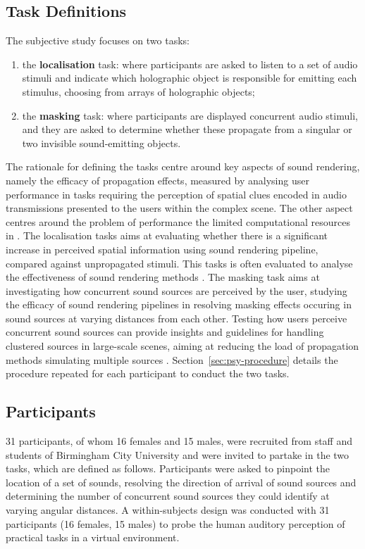 \subsection{Task Definitions}
The subjective study focuses on two tasks:
\begin{enumerate}
    \item the \textbf{localisation} task: where participants are asked to listen to a set of audio stimuli and indicate which holographic object is responsible for emitting each stimulus, choosing from arrays of holographic objects;
    \item the \textbf{masking} task: where participants are displayed concurrent audio stimuli, and they are asked to determine whether these propagate from a singular or two invisible sound-emitting objects.
\end{enumerate}
The rationale for defining the tasks centre around key aspects of sound rendering, namely the efficacy of propagation effects, measured by analysing user performance in tasks requiring the perception of spatial clues encoded in audio transmissions presented to the users within the complex scene. The other aspect centres around the problem of performance the limited computational resources in .
The localisation tasks aims at evaluating whether there is a significant increase in perceived spatial information using sound rendering pipeline, compared against unpropagated stimuli. This tasks is often evaluated to analyse the effectiveness of sound rendering methods \citep{rungta2016psychoacoustic}.
The masking task aims at investigating how concurrent sound sources are perceived by the user, studying the efficacy of sound rendering pipelines in resolving masking effects occuring in sound sources at varying distances from each other. Testing how users perceive concurrent sound sources can provide insights and guidelines for handling clustered sources in large-scale scenes, aiming at reducing the load of propagation methods simulating multiple sources \citep{schissler2016interactive}.
Section~\ref{sec:psy-procedure} details the procedure repeated for each participant to conduct the two tasks.

\subsection{Participants}
31 participants, of whom 16 females and 15 males, were recruited from staff and students of Birmingham City University and were invited to partake in the two tasks, which are defined as follows. Participants were asked to pinpoint the location of a set of sounds, resolving the direction of arrival of sound sources and determining the number of concurrent sound sources they could identify at varying angular distances. A within-subjects design was conducted with 31 participants (16 females, 15 males) to probe the human auditory perception of practical tasks in a virtual environment.

